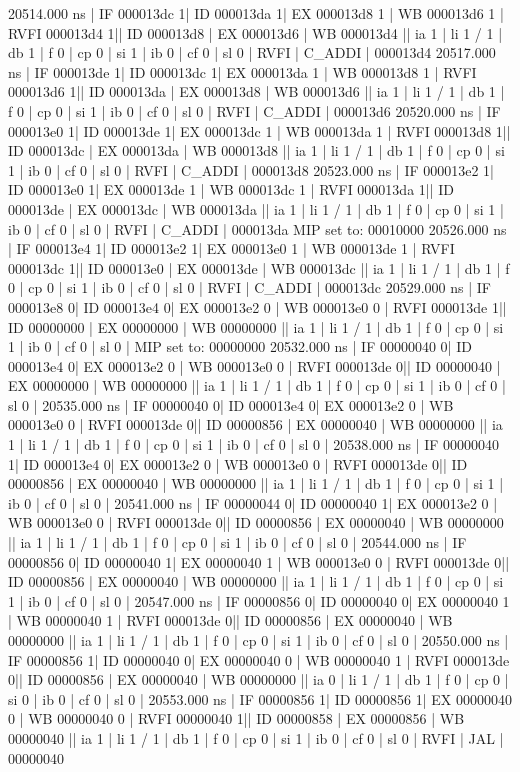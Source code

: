 \begin{terminal}
   20514.000 ns | IF 000013dc  1| ID 000013da 1| EX 000013d8 1 | WB 000013d6 1 | RVFI 000013d4 1|| ID 000013d8 | EX 000013d6 | WB 000013d4 || ia 1 | li 1 / 1 | db 1 | f 0 | cp 0 | si 1 | ib 0 | cf 0 | sl 0 | RVFI | C_ADDI   | 000013d4
   20517.000 ns | IF 000013de  1| ID 000013dc 1| EX 000013da 1 | WB 000013d8 1 | RVFI 000013d6 1|| ID 000013da | EX 000013d8 | WB 000013d6 || ia 1 | li 1 / 1 | db 1 | f 0 | cp 0 | si 1 | ib 0 | cf 0 | sl 0 | RVFI | C_ADDI   | 000013d6
   20520.000 ns | IF 000013e0  1| ID 000013de 1| EX 000013dc 1 | WB 000013da 1 | RVFI 000013d8 1|| ID 000013dc | EX 000013da | WB 000013d8 || ia 1 | li 1 / 1 | db 1 | f 0 | cp 0 | si 1 | ib 0 | cf 0 | sl 0 | RVFI | C_ADDI   | 000013d8
   20523.000 ns | IF 000013e2  1| ID 000013e0 1| EX 000013de 1 | WB 000013dc 1 | RVFI 000013da 1|| ID 000013de | EX 000013dc | WB 000013da || ia 1 | li 1 / 1 | db 1 | f 0 | cp 0 | si 1 | ib 0 | cf 0 | sl 0 | RVFI | C_ADDI   | 000013da
MIP set to: 00010000
   20526.000 ns | IF 000013e4  1| ID 000013e2 1| EX 000013e0 1 | WB 000013de 1 | RVFI 000013dc 1|| ID 000013e0 | EX 000013de | WB 000013dc || ia 1 | li 1 / 1 | db 1 | f 0 | cp 0 | si 1 | ib 0 | cf 0 | sl 0 | RVFI | C_ADDI   | 000013dc
   20529.000 ns | IF 000013e8  0| ID 000013e4 0| EX 000013e2 0 | WB 000013e0 0 | RVFI 000013de 1|| ID 00000000 | EX 00000000 | WB 00000000 || ia 1 | li 1 / 1 | db 1 | f 0 | cp 0 | si 1 | ib 0 | cf 0 | sl 0 |
MIP set to: 00000000
   20532.000 ns | IF 00000040  0| ID 000013e4 0| EX 000013e2 0 | WB 000013e0 0 | RVFI 000013de 0|| ID 00000040 | EX 00000000 | WB 00000000 || ia 1 | li 1 / 1 | db 1 | f 0 | cp 0 | si 1 | ib 0 | cf 0 | sl 0 |
   20535.000 ns | IF 00000040  0| ID 000013e4 0| EX 000013e2 0 | WB 000013e0 0 | RVFI 000013de 0|| ID 00000856 | EX 00000040 | WB 00000000 || ia 1 | li 1 / 1 | db 1 | f 0 | cp 0 | si 1 | ib 0 | cf 0 | sl 0 |
   20538.000 ns | IF 00000040  1| ID 000013e4 0| EX 000013e2 0 | WB 000013e0 0 | RVFI 000013de 0|| ID 00000856 | EX 00000040 | WB 00000000 || ia 1 | li 1 / 1 | db 1 | f 0 | cp 0 | si 1 | ib 0 | cf 0 | sl 0 |
   20541.000 ns | IF 00000044  0| ID 00000040 1| EX 000013e2 0 | WB 000013e0 0 | RVFI 000013de 0|| ID 00000856 | EX 00000040 | WB 00000000 || ia 1 | li 1 / 1 | db 1 | f 0 | cp 0 | si 1 | ib 0 | cf 0 | sl 0 |
   20544.000 ns | IF 00000856  0| ID 00000040 1| EX 00000040 1 | WB 000013e0 0 | RVFI 000013de 0|| ID 00000856 | EX 00000040 | WB 00000000 || ia 1 | li 1 / 1 | db 1 | f 0 | cp 0 | si 1 | ib 0 | cf 0 | sl 0 |
   20547.000 ns | IF 00000856  0| ID 00000040 0| EX 00000040 1 | WB 00000040 1 | RVFI 000013de 0|| ID 00000856 | EX 00000040 | WB 00000000 || ia 1 | li 1 / 1 | db 1 | f 0 | cp 0 | si 1 | ib 0 | cf 0 | sl 0 |
   20550.000 ns | IF 00000856  1| ID 00000040 0| EX 00000040 0 | WB 00000040 1 | RVFI 000013de 0|| ID 00000856 | EX 00000040 | WB 00000000 || ia 0 | li 1 / 1 | db 1 | f 0 | cp 0 | si 0 | ib 0 | cf 0 | sl 0 |
   20553.000 ns | IF 00000856  1| ID 00000856 1| EX 00000040 0 | WB 00000040 0 | RVFI 00000040 1|| ID 00000858 | EX 00000856 | WB 00000040 || ia 1 | li 1 / 1 | db 1 | f 0 | cp 0 | si 1 | ib 0 | cf 0 | sl 0 | RVFI | JAL      | 00000040    
\end{terminal}

